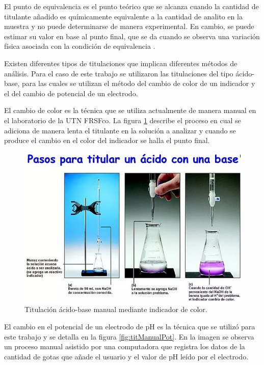 El punto de equivalencia es el punto teórico que se alcanza cuando la cantidad de titulante añadido es químicamente equivalente a la cantidad de analito
en la muestra y no puede determinarse de manera experimental. En cambio, se puede estimar su valor en base al punto final, que se da cuando se observa una variación física asociada con la condición de equivalencia \citep{BOOK:1}.

Existen diferentes tipos de titulaciones que implican diferentes métodos de análisis. Para el caso de este trabajo se utilizaron las titulaciones del tipo ácido-base, para las cuales se utilizan el método del cambio de color de un indicador y el del cambio de potencial de un electrodo.

El cambio de color es la técnica que se utiliza actualmente de manera manual en el laboratorio  de la UTN FRSFco. La figura \ref{fig:titManualColor} describe el proceso en cual se adiciona de manera lenta el titulante en la solución a analizar y cuando se produce el cambio en el color del indicador se halla el punto final.

\begin{figure}[htbp]
	\centering
	\includegraphics[width=.8\textwidth]{./Figures/titulacionManual.jpg}
	\caption{Titulación ácido-base manual mediante indicador de color\protect\footnotemark.}
	\label{fig:titManualColor}
\end{figure}



El cambio en el potencial de un electrodo de pH es la técnica que se utilizó para este trabajo y se detalla en la  figura \ref{fig:titManualPot}. En la imagen se observa un proceso manual asistido por una computadora que registra los datos de la cantidad de gotas que añade el usuario y el valor de pH leído por el electrodo.


